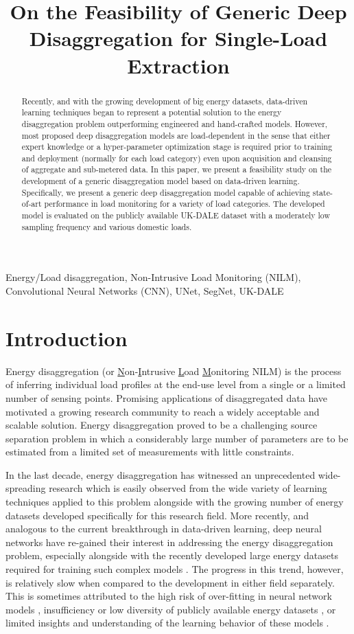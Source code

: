 \documentclass[twocolumn,letter,10pt]{IEEEtran} %
\def \enTitle{On the Feasibility of Generic Deep \\Disaggregation for Single-Load Extraction}
\def \keywords{
	Energy/Load disaggregation,
	Non-Intrusive Load Monitoring (NILM),
	Convolutional Neural Networks (CNN),
	UNet, SegNet, UK-DALE
}
\def \paperAbstract{
Recently, and with the growing development of big energy datasets, data-driven learning techniques began to represent a potential solution to the energy disaggregation problem outperforming engineered and hand-crafted models.
However, most proposed deep disaggregation models are load-dependent in the sense that either expert knowledge or a hyper-parameter optimization stage is required prior to training and deployment (normally for each load category) even upon acquisition and cleansing of aggregate and sub-metered data.
In this paper, we present a feasibility study on the development of a generic disaggregation model based on data-driven learning.
Specifically, we present a generic deep disaggregation model capable of achieving state-of-art performance in load monitoring for a variety of load categories.
The developed model is evaluated on the publicly available UK-DALE dataset with a moderately low sampling frequency and various domestic loads.
}
\begin{document}
\title{\enTitle}	%

\author{
}

\maketitle

\begin{abstract}\paperAbstract\end{abstract}


\begin{IEEEkeywords} \keywords \end{IEEEkeywords}




\section{Introduction}
\label{sec:introduction}



Energy disaggregation (or \underline{N}on-\underline{I}ntrusive \underline{L}oad \underline{M}onitoring NILM) is the process of inferring individual load profiles at the end-use level from a single or a limited number of sensing points. Promising applications of disaggregated data have motivated a growing research community to reach a widely acceptable and scalable solution. Energy disaggregation  proved to be a challenging source separation problem in which a considerably large number of parameters are to be estimated from a limited set of measurements with little constraints.

In the last decade, energy disaggregation has witnessed an unprecedented wide-spreading research which is easily observed from the wide variety of learning techniques applied to this problem alongside with the growing number of energy datasets developed specifically for this research field. More recently, and analogous to the current breakthrough in data-driven learning, deep neural networks have re-gained their interest in addressing the energy disaggregation problem, especially alongside with the recently developed large energy datasets required for training such complex models \cite{Kaman_2017,Mauch_2015,Mauch_2016,Kelly_2015,Zhang_2016_SequenceToPointLearning,He_2016_AnEmpiricalStudy, Kelly_2015_UKDALE,Parson_2015_Dataport_NILMTK}. The progress in this trend, however, is relatively slow when compared to the development in either field separately. This is sometimes attributed to the high risk of over-fitting in neural network models \cite{Makonin_2014_PhD}, insufficiency or low diversity of publicly available energy datasets \cite{Kelly_2015}, or limited insights and understanding of the learning behavior of these models \cite{Zhang_2016_SequenceToPointLearning}.
\end{document}
